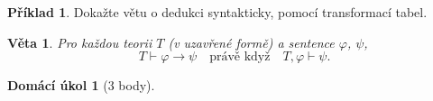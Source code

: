 \documentclass[a4paper]{article}
\theoremstyle{plain}
\newtheorem*{theorem*}{Věta}
\theoremstyle{definition}
\newtheorem{problem}{Příklad}
\newtheorem*{ukol}{Domácí úkol}
\begin{document}
\medskip\begin{problem} Dokažte větu o dedukci syntakticky, pomocí transformací tabel.
\begin{theorem*} Pro každou teorii $T$ (v uzavřené formě) a sentence $\varphi$, $\psi$,
    $$T\vdash \varphi\to\psi\quad\text{právě když}\quad T,\varphi\vdash\psi.$$
\end{theorem*}
\end{problem} 
    



\medskip\begin{ukol}[3 body]

\end{ukol}
\end{document}
